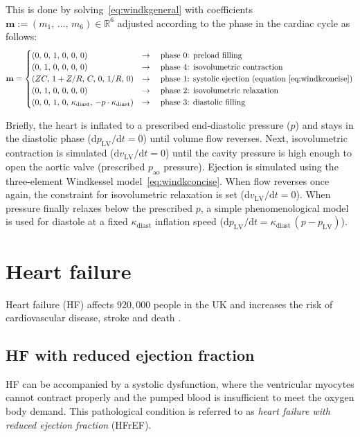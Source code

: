 \noindent
This is done by solving~\eqref{eq:windkgeneral} with coefficients  $\mathbf{m}:=(m_1,\,\dots,\,m_6)\in\mathbb{R}^6$ adjusted according to the phase in the cardiac cycle as follows:
%
\begin{equation}
    \mathbf{m} = \begin{cases}
    (0,\,0,\,1,\,0,\,0,\,0) & \rightarrow\quad\text{phase $0$: preload filling} \\
    (0,\,1,\,0,\,0,\,0,\,0) & \rightarrow\quad\text{phase $4$: isovolumetric contraction} \\
    (ZC,\,1+Z/R,\,C,\,0,\,1/R,\,0) & \rightarrow\quad\text{phase $1$: systolic ejection (equation~\eqref{eq:windkconcise})} \\
    (0,\,1,\,0,\,0,\,0,\,0) & \rightarrow\quad\text{phase $2$: isovolumetric relaxation} \\
    (0,\,0,\,1,\,0,\,\kappa_{\textrm{diast}},\,-p\cdot \kappa_{\textrm{diast}}) & \rightarrow\quad\text{phase $3$: diastolic filling}
    \end{cases}
\end{equation}

\noindent
Briefly, the heart is inflated to a prescribed end-diastolic pressure ($p$) and stays in the diastolic phase ($\textrm{d}p_{\textrm{LV}}/\textrm{d}t=0$) until volume flow reverses. Next, isovolumetric contraction is simulated ($\textrm{d}v_{\textrm{LV}}/\textrm{d}t=0$) until the cavity pressure is high enough to open the aortic valve (prescribed $p_{\textrm{ao}}$ pressure). Ejection is simulated using the three-element Windkessel model~\eqref{eq:windkconcise}. When flow reverses once again, the constraint for isovolumetric relaxation is set ($\textrm{d}v_{\textrm{LV}}/\textrm{d}t=0$). When pressure finally relaxes below the prescribed $p$, a simple phenomenological model is used for diastole at a fixed $\kappa_{\textrm{diast}}$ inflation speed ($\textrm{d}p_{\textrm{LV}}/\textrm{d}t=\kappa_{\textrm{diast}}\,(p - p_{\textrm{LV}})$).


%
%
%
\section{Heart failure}
Heart failure (\acs{HF}) affects $920,000$ people in the UK \cite{Bhf:2021} and increases the risk of cardiovascular disease, stroke and death \cite{Adelborg:2017, Henkel:2008}.


%
%
%
\subsection{HF with reduced ejection fraction}
HF can be accompanied by a systolic dysfunction, where the ventricular myocytes cannot contract properly and the pumped blood is insufficient to meet the oxygen body demand. This pathological condition is referred to as \textit{heart failure with reduced ejection fraction} (\acs{HFrEF}).


